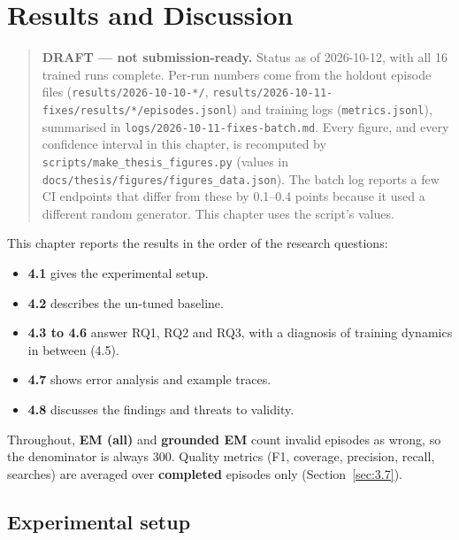 \chapter{Results and Discussion}\label{sec:4}

\begin{quote}
\textbf{DRAFT --- not submission-ready.} Status as of 2026-10-12, with
all 16 trained runs complete. Per-run numbers come from the holdout
episode files
(\texttt{results/\allowbreak{}2026-\allowbreak{}10-\allowbreak{}10-\allowbreak{}*/\allowbreak{}},
\texttt{results/\allowbreak{}2026-\allowbreak{}10-\allowbreak{}11-\allowbreak{}fixes/\allowbreak{}results/\allowbreak{}*/\allowbreak{}episodes.\allowbreak{}jsonl})
and training logs (\texttt{metrics.\allowbreak{}jsonl}), summarised in
\texttt{logs/\allowbreak{}2026-\allowbreak{}10-\allowbreak{}11-\allowbreak{}fixes-\allowbreak{}batch.\allowbreak{}md}.
Every figure, and every confidence interval in this chapter, is
recomputed by
\texttt{scripts/\allowbreak{}make\_\allowbreak{}thesis\_\allowbreak{}figures.\allowbreak{}py}
(values in
\texttt{docs/\allowbreak{}thesis/\allowbreak{}figures/\allowbreak{}figures\_\allowbreak{}data.\allowbreak{}json}).
The batch log reports a few CI endpoints that differ from these by
0.1--0.4 points because it used a different random generator. This
chapter uses the script's values.
\end{quote}

This chapter reports the results in the order of the research questions:

\begin{itemize}
\tightlist
\item
  \textbf{4.1} gives the experimental setup.
\item
  \textbf{4.2} describes the un-tuned baseline.
\item
  \textbf{4.3 to 4.6} answer RQ1, RQ2 and RQ3, with a diagnosis of
  training dynamics in between (4.5).
\item
  \textbf{4.7} shows error analysis and example traces.
\item
  \textbf{4.8} discusses the findings and threats to validity.
\end{itemize}

Throughout, \textbf{EM (all)} and \textbf{grounded EM} count invalid
episodes as wrong, so the denominator is always 300. Quality metrics
(F1, coverage, precision, recall, searches) are averaged over
\textbf{completed} episodes only (Section~\ref{sec:3.7}).

\section{Experimental setup}\label{sec:4.1}

